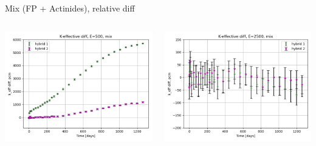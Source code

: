 \documentclass[
	11pt, %
	aspectratio=169, %
]{beamer}
\begin{document}
\begin{frame}{Mix (FP + Actinides), relative diff}
\begin{columns}[c]
\begin{column}{0.39\textwidth}
			\includegraphics[width=\textwidth]{../figures/keff/keff_mix_500_diff.png}
		\end{column}
		\begin{column}{0.39\textwidth}
			\includegraphics[width=\textwidth]{../figures/keff/keff_mix_2500_diff.png}


\end{column}
\end{columns}
\end{frame}
\end{document}
